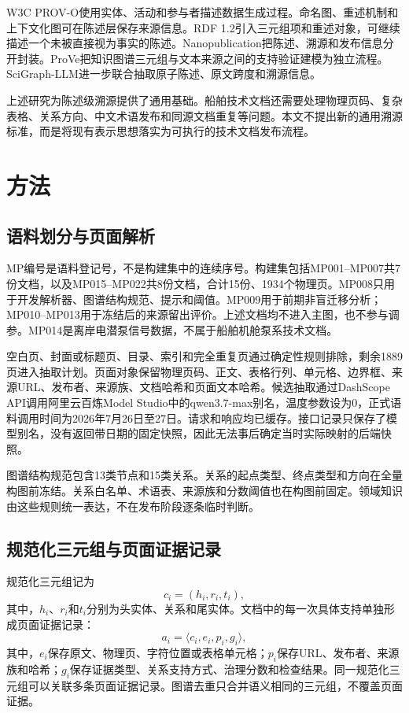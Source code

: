\documentclass[conference,a4paper]{IEEEtran}
\begin{document}
W3C PROV-O使用实体、活动和参与者描述数据生成过程\cite{W3CPROVO}。命名图、重述机制和上下文化图可在陈述层保存来源信息\cite{Sikos2020}。RDF 1.2引入三元组项和重述对象，可继续描述一个未被直接视为事实的陈述\cite{W3CRDF12}。Nanopublication把陈述、溯源和发布信息分开封装\cite{Groth2010}。ProVe把知识图谱三元组与文本来源之间的支持验证建模为独立流程\cite{Amaral2024ProVe}。SciGraph-LLM进一步联合抽取原子陈述、原文跨度和溯源信息\cite{Malashin2026}。

上述研究为陈述级溯源提供了通用基础。船舶技术文档还需要处理物理页码、复杂表格、关系方向、中文术语发布和同源文档重复等问题。本文不提出新的通用溯源标准，而是将现有表示思想落实为可执行的技术文档发布流程。

\section{方法}

\subsection{语料划分与页面解析}

MP编号是语料登记号，不是构建集中的连续序号。构建集包括MP001--MP007共7份文档，以及MP015--MP022共8份文档，合计15份、1934个物理页。MP008只用于开发解析器、图谱结构规范、提示和阈值。MP009用于前期非盲迁移分析；MP010--MP013用于冻结后的来源留出评价。上述文档均不进入主图，也不参与调参。MP014是离岸电潜泵信号数据，不属于船舶机舱泵系技术文档。

空白页、封面或标题页、目录、索引和完全重复页通过确定性规则排除，剩余1889页进入抽取计划。页面对象保留物理页码、正文、表格行列、单元格、边界框、来源URL、发布者、来源族、文档哈希和页面文本哈希。候选抽取通过DashScope API调用阿里云百炼Model Studio中的\mbox{qwen3.7-max}别名，温度参数设为0，正式语料调用时间为2026年7月26日至27日。请求和响应均已缓存。接口记录只保存了模型别名，没有返回带日期的固定快照，因此无法事后确定当时实际映射的后端快照。

图谱结构规范包含13类节点和15类关系。关系的起点类型、终点类型和方向在全量构图前冻结。关系白名单、术语表、来源族和分数阈值也在构图前固定。领域知识由这些规则统一表达，不在发布阶段逐条临时判断。

\subsection{规范化三元组与页面证据记录}

规范化三元组记为
\begin{equation}
c_i=(h_i,r_i,t_i),
\label{eq:triple}
\end{equation}
其中，$h_i$、$r_i$和$t_i$分别为头实体、关系和尾实体。文档中的每一次具体支持单独形成页面证据记录：
\begin{equation}
a_i=\langle c_i,e_i,p_i,g_i\rangle,
\label{eq:evidence}
\end{equation}
其中，$e_i$保存原文、物理页、字符位置或表格单元格；$p_i$保存URL、发布者、来源族和哈希；$g_i$保存证据类型、关系支持方式、治理分数和检查结果。同一规范化三元组可以关联多条页面证据记录。图谱去重只合并语义相同的三元组，不覆盖页面证据。
\end{document}
